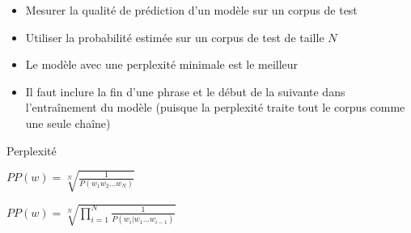 \documentclass{KodeBook}
\begin{document}
\begin{itemize}
	\item Mesurer la qualité de prédiction d'un modèle sur un corpus de test
	\item Utiliser la probabilité estimée sur un corpus de test de taille $N$
	\item Le modèle avec une perplexité minimale est le meilleur
	\item Il faut inclure la fin d'une phrase et le début de la suivante dans l'entraînement du modèle (puisque la perplexité traite tout le corpus comme une seule chaîne)
\end{itemize}

\begin{block}{Perplexité}
	\begin{center}
		$PP(w) = \sqrt[N]{\frac{1}{P(w_1 w_2 \ldots w_N)}}$
		
		$PP(w) = \sqrt[N]{\prod\limits_{i=1}^{N}\frac{1}{P(w_i | w_1 \ldots w_{i-1})}}$
	\end{center}
\end{block}






\begin{discussion}



\end{discussion}

\ifx\wholebook\relax\else
% 
% 
	
\end{document}

